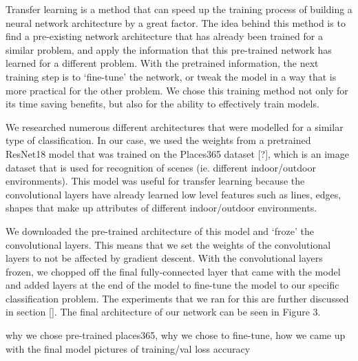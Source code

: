 \documentclass[10pt,twocolumn,letterpaper]{article}
\begin{document}
Transfer learning is a method that can speed up the training process of building a neural network architecture by a great factor. The idea behind this method is to find a pre-existing network architecture that has already been trained for a similar problem, and apply the information that this pre-trained network has learned for a different problem. With the pretrained information, the next training step is to ‘fine-tune’ the network, or tweak the model in a way that is more practical for the other problem. We chose this training method not only for its time saving benefits, but also for the ability to effectively train models.

We researched numerous different architectures that were modelled for a similar type of classification. In our case, we used the weights from a pretrained ResNet18 model that was trained on the Places365 dataset [?], which is an image dataset that is used for recognition of scenes (ie. different indoor/outdoor environments). This model was useful for transfer learning because the convolutional layers have already learned low level features such as lines, edges, shapes that make up attributes of different indoor/outdoor environments.

We downloaded the pre-trained architecture of this model and ‘froze’ the convolutional layers. This means that we set the weights of the convolutional layers to not be affected by gradient descent. With the convolutional layers frozen, we chopped off the final fully-connected layer that came with the model and added layers at the end of the model to fine-tune the model to our specific classification problem. The experiments that we ran for this are further discussed in section [].  The final architecture of our network can be seen in Figure 3. 

why we chose pre-trained places365, why we chose to fine-tune, how we came up with the final model
pictures of training/val loss accuracy
\end{document}
